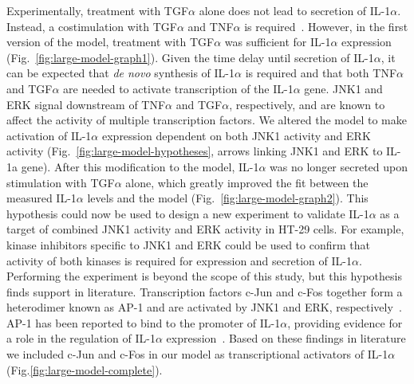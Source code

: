 Experimentally,
treatment with TGF$\alpha$ alone does not lead to secretion of IL-1$\alpha$. Instead, a costimulation with 
TGF$\alpha$ and TNF$\alpha$ is required~\citep{pathway-autocrine}.
However, in the first version of the model, treatment with TGF$\alpha$ was sufficient for
IL-1$\alpha$ expression (Fig.~\ref{fig:large-model-graph1}). Given the time delay until secretion of IL-1$\alpha$, it can be
expected that \emph{de novo} synthesis of IL-1$\alpha$ is required and that both
TNF$\alpha$ and TGF$\alpha$ are needed to activate transcription of the IL-1$\alpha$ gene.
JNK1 and ERK signal downstream of TNF$\alpha$ and TGF$\alpha$, respectively, and are known
to affect the activity of multiple transcription factors. We altered the model to make
activation of IL-1$\alpha$ expression dependent on both JNK1 activity and ERK activity
(Fig.~\ref{fig:large-model-hypotheses}, arrows linking {\sf JNK1} and {\sf ERK} to {\sf IL-1a gene}).
After this modification to the model, IL-1$\alpha$ was no longer secreted
upon stimulation with TGF$\alpha$ alone, which greatly improved the fit between the measured IL-1$\alpha$ 
levels and the model (Fig.~\ref{fig:large-model-graph2}). This hypothesis could now be used to 
design a new experiment to validate IL-1$\alpha$ as a target of combined JNK1 activity and ERK activity in 
HT-29 cells. For example, kinase inhibitors specific to JNK1 and ERK could be used to confirm that activity of 
both kinases is required for expression and secretion of IL-1$\alpha$. Performing the experiment is beyond 
the scope of this study, but this hypothesis finds support in literature. 
Transcription factors c-Jun and c-Fos together
form a heterodimer known as AP-1 and are activated by JNK1 and ERK,
respectively~\citep{jnk-signaling,cfos-cjun}. AP-1 has been reported to bind to the
promoter of IL-1$\alpha$, providing evidence for a role in the regulation of IL-1$\alpha$
expression~\citep{ap1-il1a}. Based on these findings in literature we included c-Jun and
c-Fos in our model as transcriptional activators of IL-1$\alpha$ (Fig.\ref{fig:large-model-complete}).

